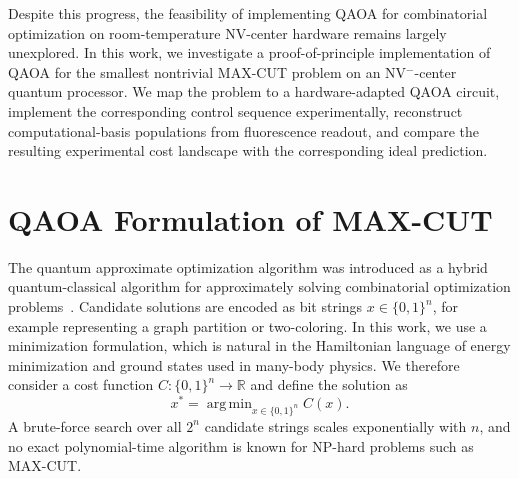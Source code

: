 \documentclass[conference]{IEEEtran}
\DeclareMathOperator*{\argmin}{arg\,min}
\begin{document}
Despite this progress, the feasibility of implementing QAOA for combinatorial
optimization on room-temperature NV-center hardware remains largely unexplored.
In this work, we investigate a proof-of-principle implementation of QAOA for the
smallest nontrivial MAX-CUT problem on an NV\(^-\)-center quantum processor. We
map the problem to a hardware-adapted QAOA circuit, implement the corresponding
control sequence experimentally, reconstruct computational-basis populations
from fluorescence readout, and compare the resulting experimental cost landscape
with the corresponding ideal prediction.




\section{QAOA Formulation of MAX-CUT}

The quantum approximate optimization algorithm was introduced as a hybrid
quantum-classical algorithm for approximately solving combinatorial optimization
problems~\cite{farhi2014quantumapproximateoptimizationalgorithm}. Candidate
solutions are encoded as bit strings \(x\in\{0,1\}^n\), for example representing
a graph partition or two-coloring. In this work, we use a minimization
formulation, which is natural in the Hamiltonian language of energy minimization
and ground states used in many-body physics. We therefore consider a cost
function \(C:\{0,1\}^n\to\mathbb{R}\) and define the solution as
\begin{equation}
    x^*=\argmin_{x\in\{0,1\}^n} C(x).
\end{equation}
A brute-force search over all \(2^n\) candidate strings scales exponentially
with \(n\), and no exact polynomial-time algorithm is known for NP-hard problems
such as MAX-CUT.
\end{document}
